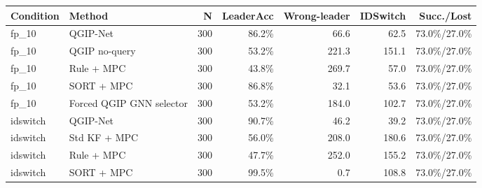 \begin{tabular}{llrrrrr}
\toprule
\textbf{Condition} & \textbf{Method} & \textbf{N} & \textbf{LeaderAcc} & \textbf{Wrong-leader} & \textbf{IDSwitch} & \textbf{Succ./Lost} \\
\midrule
fp_10 & QGIP-Net & 300 & 86.2\% & 66.6 & 62.5 & 73.0\%/27.0\% \\
fp_10 & QGIP no-query & 300 & 53.2\% & 221.3 & 151.1 & 73.0\%/27.0\% \\
fp_10 & Rule + MPC & 300 & 43.8\% & 269.7 & 57.0 & 73.0\%/27.0\% \\
fp_10 & SORT + MPC & 300 & 86.8\% & 32.1 & 53.6 & 73.0\%/27.0\% \\
fp_10 & Forced QGIP GNN selector & 300 & 53.2\% & 184.0 & 102.7 & 73.0\%/27.0\% \\
idswitch & QGIP-Net & 300 & 90.7\% & 46.2 & 39.2 & 73.0\%/27.0\% \\
idswitch & Std KF + MPC & 300 & 56.0\% & 208.0 & 180.6 & 73.0\%/27.0\% \\
idswitch & Rule + MPC & 300 & 47.7\% & 252.0 & 155.2 & 73.0\%/27.0\% \\
idswitch & SORT + MPC & 300 & 99.5\% & 0.7 & 108.8 & 73.0\%/27.0\% \\
\bottomrule
\end{tabular}
